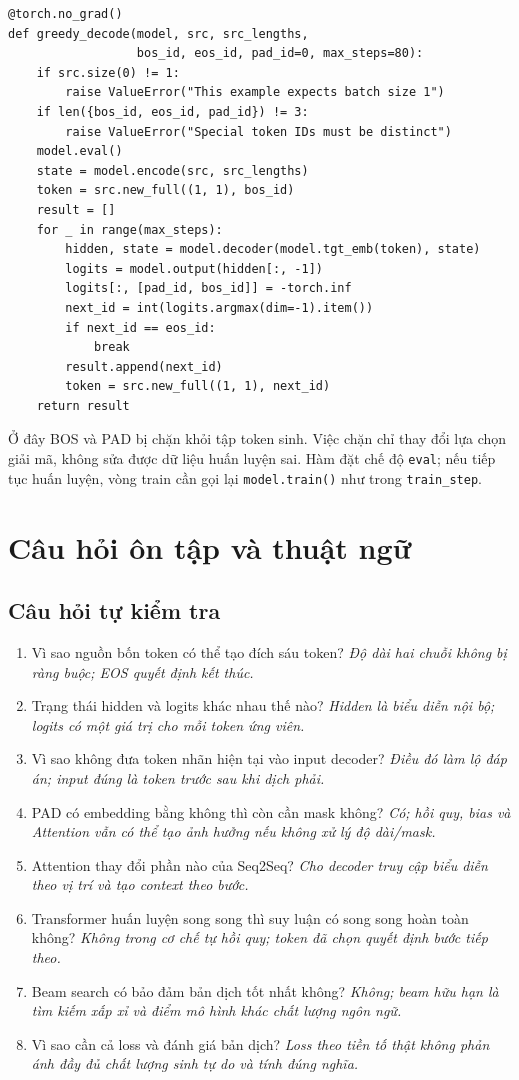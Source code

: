 \documentclass[11pt,a4paper]{article}
\numberwithin{equation}{section}
\begin{document}
\begin{lstlisting}
@torch.no_grad()
def greedy_decode(model, src, src_lengths,
                  bos_id, eos_id, pad_id=0, max_steps=80):
    if src.size(0) != 1:
        raise ValueError("This example expects batch size 1")
    if len({bos_id, eos_id, pad_id}) != 3:
        raise ValueError("Special token IDs must be distinct")
    model.eval()
    state = model.encode(src, src_lengths)
    token = src.new_full((1, 1), bos_id)
    result = []
    for _ in range(max_steps):
        hidden, state = model.decoder(model.tgt_emb(token), state)
        logits = model.output(hidden[:, -1])
        logits[:, [pad_id, bos_id]] = -torch.inf
        next_id = int(logits.argmax(dim=-1).item())
        if next_id == eos_id:
            break
        result.append(next_id)
        token = src.new_full((1, 1), next_id)
    return result
\end{lstlisting}
Ở đây BOS và PAD bị chặn khỏi tập token sinh. Việc chặn chỉ thay đổi lựa chọn giải mã, không sửa được dữ liệu huấn luyện sai. Hàm đặt chế độ \texttt{eval}; nếu tiếp tục huấn luyện, vòng train cần gọi lại \texttt{model.train()} như trong \texttt{train\_step}.

\clearpage
\begingroup
{}
\small
\section{Câu hỏi ôn tập và thuật ngữ}
\subsection{Câu hỏi tự kiểm tra}
\begin{enumerate}
\item Vì sao nguồn bốn token có thể tạo đích sáu token? \emph{Độ dài hai chuỗi không bị ràng buộc; EOS quyết định kết thúc.}
\item Trạng thái hidden và logits khác nhau thế nào? \emph{Hidden là biểu diễn nội bộ; logits có một giá trị cho mỗi token ứng viên.}
\item Vì sao không đưa token nhãn hiện tại vào input decoder? \emph{Điều đó làm lộ đáp án; input đúng là token trước sau khi dịch phải.}
\item PAD có embedding bằng không thì còn cần mask không? \emph{Có; hồi quy, bias và Attention vẫn có thể tạo ảnh hưởng nếu không xử lý độ dài/mask.}
\item Attention thay đổi phần nào của Seq2Seq? \emph{Cho decoder truy cập biểu diễn theo vị trí và tạo context theo bước.}
\item Transformer huấn luyện song song thì suy luận có song song hoàn toàn không? \emph{Không trong cơ chế tự hồi quy; token đã chọn quyết định bước tiếp theo.}
\item Beam search có bảo đảm bản dịch tốt nhất không? \emph{Không; beam hữu hạn là tìm kiếm xấp xỉ và điểm mô hình khác chất lượng ngôn ngữ.}
\item Vì sao cần cả loss và đánh giá bản dịch? \emph{Loss theo tiền tố thật không phản ánh đầy đủ chất lượng sinh tự do và tính đúng nghĩa.}
\end{enumerate}
\end{document}
